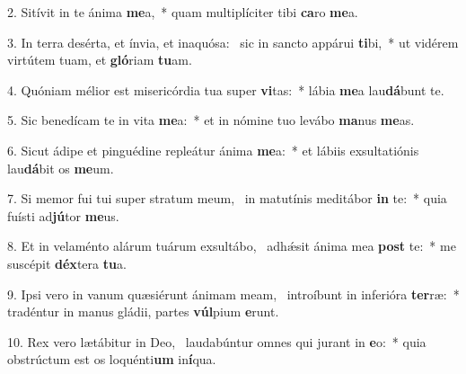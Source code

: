 2. Sitívit in te ánima \textbf{me}a,~*  quam multiplíciter tibi \textbf{ca}ro \textbf{me}a.\

3. In terra desérta, et ínvia, et inaquósa: \dag\  sic in sancto appárui \textbf{ti}bi,~*  ut vidérem virtútem tuam, et \textbf{gló}riam \textbf{tu}am.\

4. Quóniam mélior est misericórdia tua super \textbf{vi}tas:~*  lábia \textbf{me}a lau\textbf{dá}bunt te.\

5. Sic benedícam te in vita \textbf{me}a:~*  et in nómine tuo levábo \textbf{ma}nus \textbf{me}as.\

6. Sicut ádipe et pinguédine repleátur ánima \textbf{me}a:~*  et lábiis exsultatiónis lau\textbf{dá}bit os \textbf{me}um.\

7. Si memor fui tui super stratum meum, \dag\  in matutínis meditábor \textbf{in} te:~*  quia fuísti ad\textbf{jú}tor \textbf{me}us.\

8. Et in velaménto alárum tuárum exsultábo, \dag\  adhǽsit ánima mea \textbf{post} te:~*  me suscépit \textbf{déx}tera \textbf{tu}a.\

9. Ipsi vero in vanum quæsiérunt ánimam meam, \dag\  introíbunt in inferióra \textbf{ter}ræ:~*  tradéntur in manus gládii, partes \textbf{vúl}pium \textbf{e}runt.\

10. Rex vero lætábitur in Deo, \dag\  laudabúntur omnes qui jurant in \textbf{e}o:~*  quia obstrúctum est os loquénti\textbf{um} in\textbf{í}qua.\

